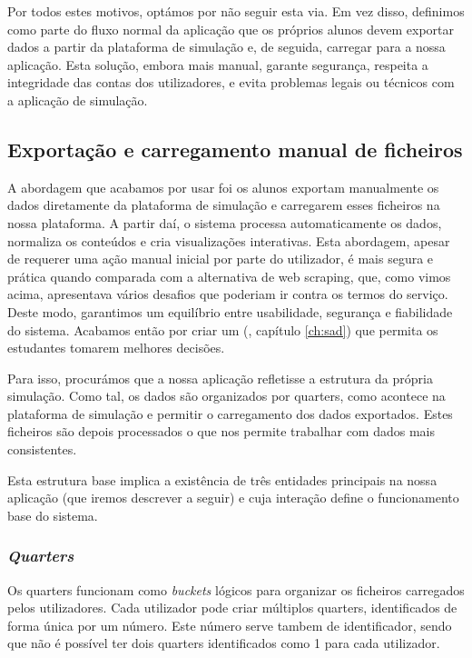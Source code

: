 Por todos estes motivos, optámos por não seguir esta via. Em vez disso, definimos como parte do fluxo normal da aplicação que os próprios alunos devem exportar dados a partir da plataforma de simulação e, de seguida, carregar para a nossa aplicação. Esta solução, embora mais manual, garante segurança, respeita a integridade das contas dos utilizadores, e evita problemas legais ou técnicos com a aplicação de simulação.

\subsection{Exportação e carregamento manual de ficheiros}

A abordagem que acabamos por usar foi os alunos exportam manualmente os dados diretamente da plataforma de simulação e carregarem esses ficheiros na nossa plataforma. A partir daí, o sistema processa automaticamente os dados, normaliza os conteúdos e cria visualizações interativas. Esta abordagem, apesar de requerer uma ação manual inicial por parte do utilizador, é mais segura e prática quando comparada com a alternativa de web scraping, que, como vimos acima, apresentava vários desafios que poderiam ir contra os termos do serviço. Deste modo, garantimos um equilíbrio entre usabilidade, segurança e fiabilidade do sistema. Acabamos então por criar um  (\cf, capítulo \ref{ch:sad}) que permita os estudantes tomarem melhores decisões.


Para isso, procurámos que a nossa aplicação refletisse a estrutura da própria simulação. Como tal, os dados são organizados por quarters, como acontece na plataforma de simulação e permitir o carregamento dos dados exportados. Estes ficheiros são depois processados o que nos permite trabalhar com dados mais consistentes. 

Esta estrutura base implica a existência de três entidades principais na nossa aplicação (que iremos descrever a seguir) e cuja interação define o funcionamento base do sistema.


\subsubsection{\textit{Quarters}}
Os quarters funcionam como \textit{buckets} lógicos para organizar os ficheiros carregados pelos utilizadores. Cada utilizador pode criar múltiplos quarters, identificados de forma única por um número. Este número serve tambem de identificador, sendo que não é possível ter dois quarters identificados como 1 para cada utilizador.

